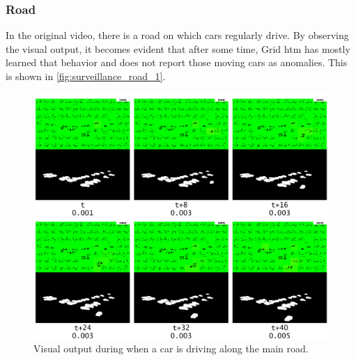 \subsubsection{Road}
In the original video, there is a road on which cars regularly drive. By observing the visual output, it becomes evident that after some time, Grid \gls*{htm} has mostly learned that behavior and does not report those moving cars as anomalies. This is shown in \autoref{fig:surveillance_road_1}.
\begin{figure}[H]
    \centering
    \includegraphics[width=\textwidth]{resources/experiments/surveillance/surveillance_road_1.png}
    \caption[Car Driving Along Main Road]{Visual output during when a car is driving along the main road.}
    \label{fig:surveillance_road_1}
\end{figure}
